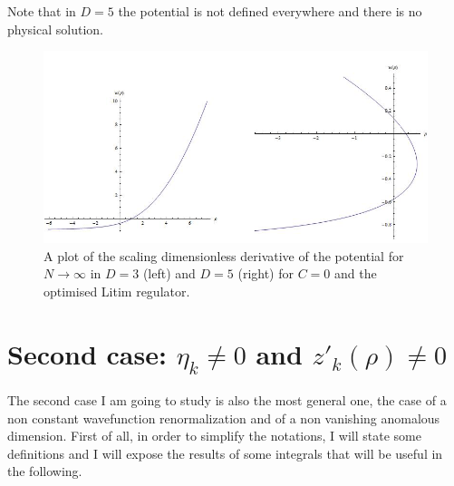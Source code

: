 Note that in $D=5$ the potential is not defined everywhere and there is no physical solution.

\begin{figure}
\begin{center}
\includegraphics[scale=0.35]{Immagini/potenziali.png}
\caption{A plot of the scaling dimensionless derivative of the potential for $N\to\infty$ in $D=3$ (left) and $D=5$ (right) for $C = 0$ and the optimised Litim regulator.}
\label{fig:potenziali}
\end{center}
\end{figure}
\section{Second case: $\eta_k \neq 0$ and $z'_k(\rho) \neq 0$}
The second case I am going to study is also the most general one, the case of a non constant wavefunction renormalization and of a non vanishing anomalous dimension.
First of all, in order to simplify the notations, I will state some definitions and I will expose the results of some integrals that will be useful in the following.
